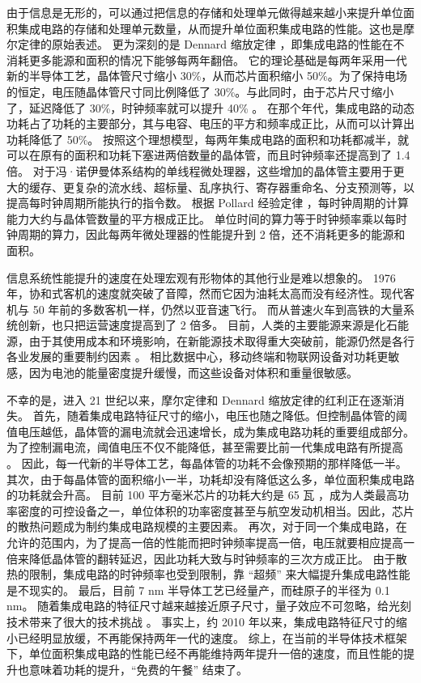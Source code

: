 由于信息是无形的，可以通过把信息的存储和处理单元做得越来越小来提升单位面积集成电路的存储和处理单元数量，从而提升单位面积集成电路的性能。这也是摩尔定律的原始表述。
更为深刻的是 Dennard 缩放定律 \cite{dennard1974design}，即集成电路的性能在不消耗更多能源和面积的情况下能够每两年翻倍。
它的理论基础是每两年采用一代新的半导体工艺，晶体管尺寸缩小 30\%，从而芯片面积缩小 50\%。为了保持电场的恒定，电压随晶体管尺寸同比例降低了 30\%。与此同时，由于芯片尺寸缩小了，延迟降低了 30\%，时钟频率就可以提升 40\% \cite{borkar1999design,borkar2011future}。
在那个年代，集成电路的动态功耗占了功耗的主要部分，其与电容、电压的平方和频率成正比，从而可以计算出功耗降低了 50\%。
按照这个理想模型，每两年集成电路的面积和功耗都减半，就可以在原有的面积和功耗下塞进两倍数量的晶体管，而且时钟频率还提高到了 1.4 倍。
对于冯·诺伊曼体系结构的单线程微处理器，这些增加的晶体管主要用于更大的缓存、更复杂的流水线、超标量、乱序执行、寄存器重命名、分支预测等，以提高每时钟周期所能执行的指令数。
根据 Pollard 经验定律 \cite{pollackpollack}，每时钟周期的计算能力大约与晶体管数量的平方根成正比。
单位时间的算力等于时钟频率乘以每时钟周期的算力，因此每两年微处理器的性能提升到 2 倍，还不消耗更多的能源和面积。

信息系统性能提升的速度在处理宏观有形物体的其他行业是难以想象的。
1976 年，协和式客机的速度就突破了音障，然而它因为油耗太高而没有经济性。现代客机与 50 年前的多数客机一样，仍然以亚音速飞行。
而从普速火车到高铁的大量系统创新，也只把运营速度提高到了 2 倍多。
目前，人类的主要能源来源是化石能源，由于其使用成本和环境影响，在新能源技术取得重大突破前，能源仍然是各行各业发展的重要制约因素 \cite{energy}。
相比数据中心，移动终端和物联网设备对功耗更敏感，因为电池的能量密度提升缓慢，而这些设备对体积和重量很敏感。

不幸的是，进入 21 世纪以来，摩尔定律和 Dennard 缩放定律的红利正在逐渐消失。
首先，随着集成电路特征尺寸的缩小，电压也随之降低。但控制晶体管的阈值电压越低，晶体管的漏电流就会迅速增长，成为集成电路功耗的重要组成部分。
为了控制漏电流，阈值电压不仅不能降低，甚至需要比前一代集成电路有所提高 \cite{borkar1999design}。
因此，每一代新的半导体工艺，每晶体管的功耗不会像预期的那样降低一半。
其次，由于每晶体管的面积缩小一半，功耗却没有降低这么多，单位面积集成电路的功耗就会升高。
目前 100 平方毫米芯片的功耗大约是 65 瓦 \cite{borkar2011future}，成为人类最高功率密度的可控设备之一，单位体积的功率密度甚至与航空发动机相当。因此，芯片的散热问题成为制约集成电路规模的主要因素。
再次，对于同一个集成电路，在允许的范围内，为了提高一倍的性能而把时钟频率提高一倍，电压就要相应提高一倍来降低晶体管的翻转延迟，因此功耗大致与时钟频率的三次方成正比。
由于散热的限制，集成电路的时钟频率也受到限制，靠 ``超频'' 来大幅提升集成电路性能是不现实的。
最后，目前 7 nm 半导体工艺已经量产，而硅原子的半径为 0.1 nm。
随着集成电路的特征尺寸越来越接近原子尺寸，量子效应不可忽略，给光刻技术带来了很大的技术挑战 \cite{borkar2011future}。
事实上，约 2010 年以来，集成电路特征尺寸的缩小已经明显放缓，不再能保持两年一代的速度。
综上，在当前的半导体技术框架下，单位面积集成电路的性能已经不再能维持两年提升一倍的速度，而且性能的提升也意味着功耗的提升，``免费的午餐'' 结束了。

